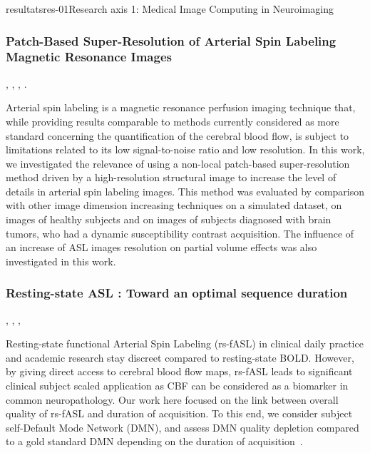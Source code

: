\documentclass{ra2018}
\begin{document}
\begin{module}{resultats}{res-01}{Research axis 1: Medical Image Computing in Neuroimaging}
\subsubsection{Patch-Based Super-Resolution of Arterial Spin Labeling Magnetic Resonance Images}
\begin{participants}
      , 
      , 
      ,
      .
\end{participants}
Arterial spin labeling is a magnetic resonance perfusion imaging technique that, while providing results comparable to methods currently considered as more standard concerning the quantification of the cerebral blood flow, is subject to limitations related to its low signal-to-noise ratio and low resolution. In this work, we investigated the relevance of using a non-local patch-based super-resolution method driven by a high-resolution structural image to increase the level of details in arterial spin labeling images. This method was evaluated by comparison with other image dimension increasing techniques on a simulated dataset, on images of healthy subjects and on images of subjects diagnosed with brain tumors, who had a dynamic susceptibility contrast acquisition. The influence of an increase of ASL images resolution on partial volume effects was also investigated in this work.~\cite{meuree:inserm-01880726}

\subsubsection{Resting-state ASL : Toward an optimal sequence duration}
\begin{participants}
      , 
      ,
      ,
\end{participants}
Resting-state functional Arterial Spin Labeling (rs-fASL) in clinical daily practice and academic research stay discreet compared to resting-state BOLD. However, by giving direct access to cerebral blood flow maps, rs-fASL leads to significant clinical subject scaled application as CBF can be considered as a biomarker in common neuropathology. Our work here focused on the link between overall quality of rs-fASL and duration of acquisition. To this end, we consider subject self-Default Mode Network (DMN), and assess DMN quality depletion compared to a gold standard DMN depending on the duration of acquisition~\cite{vallee:inserm-01935089}.



\end{module}
\end{document}
